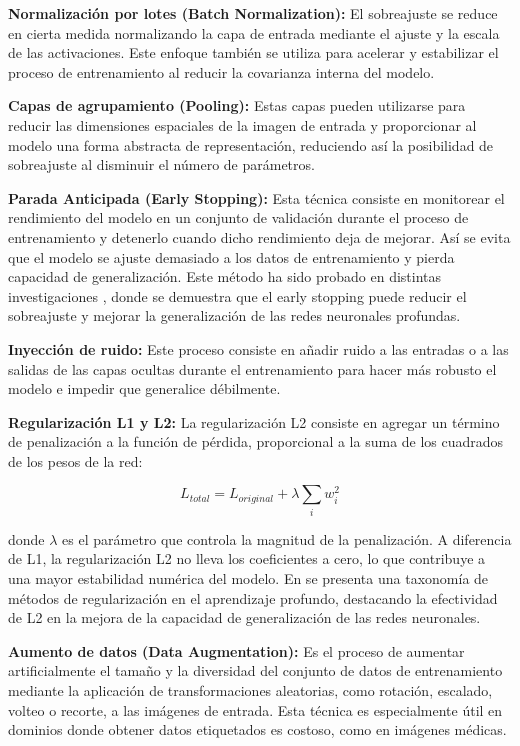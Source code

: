 \textbf{Normalización por lotes (Batch Normalization):} El sobreajuste se reduce en cierta medida normalizando la capa de entrada mediante el ajuste y la escala de las activaciones. Este enfoque también se utiliza para acelerar y estabilizar el proceso de entrenamiento al reducir la covarianza interna del modelo.

\textbf{Capas de agrupamiento (Pooling):} Estas capas pueden utilizarse para reducir las dimensiones espaciales de la imagen de entrada y proporcionar al modelo una forma abstracta de representación, reduciendo así la posibilidad de sobreajuste al disminuir el número de parámetros.

\textbf{Parada Anticipada (Early Stopping):} Esta técnica consiste en monitorear el rendimiento del modelo en un conjunto de validación durante el proceso de entrenamiento y detenerlo cuando dicho rendimiento deja de mejorar. Así se evita que el modelo se ajuste demasiado a los datos de entrenamiento y pierda capacidad de generalización. Este método ha sido probado en distintas investigaciones , donde se demuestra que el early stopping puede reducir el sobreajuste y mejorar la generalización de las redes neuronales profundas.

\textbf{Inyección de ruido:} Este proceso consiste en añadir ruido a las entradas o a las salidas de las capas ocultas durante el entrenamiento para hacer más robusto el modelo e impedir que generalice débilmente.

\textbf{Regularización L1 y L2:} La regularización L2 consiste en agregar un término de penalización a la función de pérdida, proporcional a la suma de los cuadrados de los pesos de la red:

\begin{equation}
L_{total} = L_{original} + \lambda \sum_{i} w_i^2
\end{equation}

donde $\lambda$ es el parámetro que controla la magnitud de la penalización. A diferencia de L1, la regularización L2 no lleva los coeficientes a cero, lo que contribuye a una mayor estabilidad numérica del modelo. En  se presenta una taxonomía de métodos de regularización en el aprendizaje profundo, destacando la efectividad de L2 en la mejora de la capacidad de generalización de las redes neuronales.

\textbf{Aumento de datos (Data Augmentation):} Es el proceso de aumentar artificialmente el tamaño y la diversidad del conjunto de datos de entrenamiento mediante la aplicación de transformaciones aleatorias, como rotación, escalado, volteo o recorte, a las imágenes de entrada. Esta técnica es especialmente útil en dominios donde obtener datos etiquetados es costoso, como en imágenes médicas.

